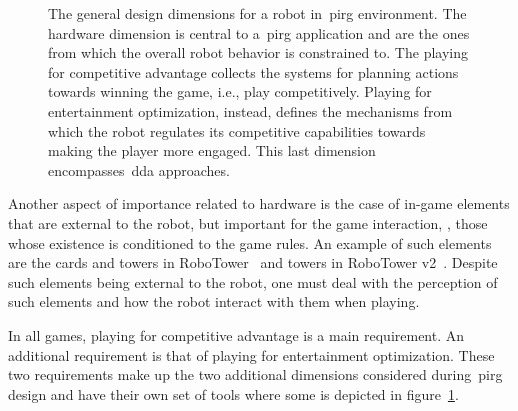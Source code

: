 \begin{figure}[h]
    \caption{The general design dimensions for a robot in~\gls{pirg} environment. The hardware dimension is central to a~\gls{pirg} application and are the ones from which the overall robot behavior is constrained to. The playing for competitive advantage collects the systems for planning actions towards winning the game, i.e., play competitively. Playing for entertainment optimization, instead, defines the mechanisms from which the robot regulates its competitive capabilities towards making the player more engaged. This last dimension encompasses~\glsdesc{dda} approaches.}
    \label{graph:PIRG_design_structure}
\end{figure}

Another aspect of importance related to hardware is the case of in-game elements that are external to the robot, but important for the game interaction, \ie, those whose existence is conditioned to the game rules. An example of such elements are the cards and towers in RoboTower~\citep{bonarini_timing_2014} and towers in RoboTower v2~\citep{oliveira_activity_2017}. Despite such elements being external to the robot, one must deal with the perception of such elements and how the robot interact with them when playing.

In all games, playing for competitive advantage is a main requirement. An additional requirement is that of playing for entertainment optimization. These two requirements make up the two additional dimensions considered during~\gls{pirg} design and have their own set of tools where some is depicted in figure~\ref{graph:PIRG_design_structure}. 




%
%


